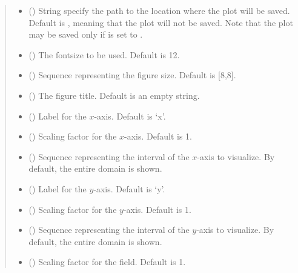 \documentclass[letterpaper,10pt,english]{sphinxmanual}
\begin{document}
\begin{fulllineitems}
\begin{quote}
\begin{description}
\begin{itemize}
\item {} 
 () \textendash{} String specify the path to the location where the plot will be saved. Default is ,
meaning that the plot will not be saved. Note that the plot may be saved only if 
is set to .

\item {} 
 () \textendash{} The fontsize to be used. Default is 12.

\item {} 
 () \textendash{} Sequence representing the figure size. Default is {[}8,8{]}.

\item {} 
 () \textendash{} The figure title. Default is an empty string.

\item {} 
 () \textendash{} Label for the \(x\)-axis. Default is ‘x’.

\item {} 
 () \textendash{} Scaling factor for the \(x\)-axis. Default is 1.

\item {} 
 () \textendash{} Sequence representing the interval of the \(x\)-axis to visualize.
By default, the entire domain is shown.

\item {} 
 () \textendash{} Label for the \(y\)-axis. Default is ‘y’.

\item {} 
 () \textendash{} Scaling factor for the \(y\)-axis. Default is 1.

\item {} 
 () \textendash{} Sequence representing the interval of the \(y\)-axis to visualize.
By default, the entire domain is shown.

\item {} 
 () \textendash{} Scaling factor for the field. Default is 1.


\end{itemize}
\end{description}
\end{quote}
\end{fulllineitems}
\end{document}

